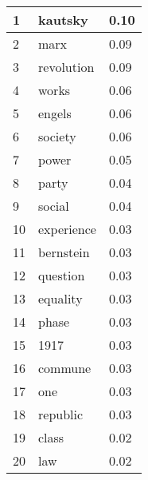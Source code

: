 \documentclass{pnastwo}
\begin{document}
\begin{article}
\begin{center}
\begin{tabular}{ | l | l | l |}
    1 & kautsky & 0.10 \\ \hline
    2 &  marx & 0.09 \\ \hline
    3 &  revolution & 0.09 \\ \hline
    4 &  works & 0.06 \\ \hline 
    5 & engels & 0.06 \\ \hline
    6 &  society & 0.06 \\ \hline
    7 & power & 0.05 \\ \hline
    8 &  party & 0.04 \\ \hline
    9 &  social & 0.04 \\ \hline
    10 &  experience & 0.03 \\ \hline 
    11 & bernstein & 0.03 \\ \hline
    12 &  question & 0.03 \\ \hline 
    13 & equality & 0.03 \\ \hline
    14 &  phase & 0.03 \\ \hline
    15 & 1917 & 0.03 \\ \hline
    16 & commune & 0.03 \\ \hline
    17 & one & 0.03 \\ \hline
    18 & republic & 0.03 \\ \hline
    19 & class & 0.02 \\ \hline
    20 & law & 0.02 \\ \hline
  \end{tabular}
\end{center}



\end{article}
\end{document}
